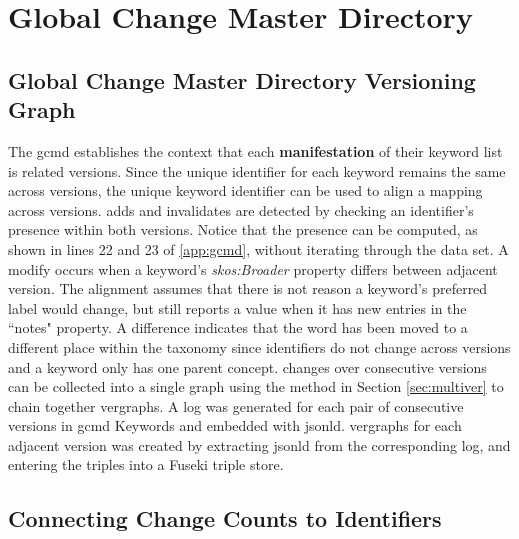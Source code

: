 \section{Global Change Master Directory}

\subsection{Global Change Master Directory Versioning Graph}

The \gls{gcmd} establishes the context that each \textbf{manifestation} of their keyword list is related versions.
Since the unique identifier for each keyword remains the same across versions, the unique keyword identifier can be used to align a mapping across \glspl{version}.
\Glspl{add} and \glspl{invalidate} are detected by checking an identifier's presence within both versions.
Notice that the presence can be computed, as shown in lines 22 and 23 of \ref{app:gcmd}, without iterating through the data set.
A \gls{modify} occurs when a keyword's \textit{skos:Broader} property differs between adjacent \gls{version}.
The alignment assumes that there is not reason a keyword's preferred label would change, but still reports a value when it has new entries in the ``notes" property.
A difference indicates that the word has been moved to a different place within the taxonomy since identifiers do not change across versions and a keyword only has one parent concept.
\Glspl{change} over consecutive \glspl{version} can be collected into a single graph using the method in Section \ref{sec:multiver} to chain together \glspl{vergraph}.
A \gls{log} was generated for each pair of consecutive versions in \gls{gcmd} Keywords and embedded with \gls{jsonld}.
\Glspl{vergraph} for each adjacent \gls{version} was created by extracting \gls{jsonld} from the corresponding \gls{log}, and entering the triples into a Fuseki triple store.

\subsection{Connecting Change Counts to Identifiers} \label{gcmd_85}

